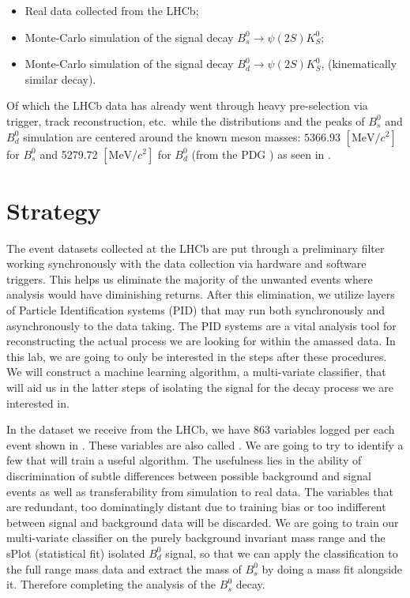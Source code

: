 \begin{itemize}
    \item Real data collected from the LHCb;
    \item Monte-Carlo simulation of the signal decay $B_{s}^{0}\rightarrow \psi(2S)K_{S}^{0}$;
    \item Monte-Carlo simulation of the signal decay $B_{d}^{0}\rightarrow \psi(2S)K_{S}^{0}$, (kinematically similar decay).
\end{itemize}
Of which the LHCb data has already went through heavy pre-selection via trigger, track reconstruction, etc.\ while the distributions and the peaks of $B_{s}^{0}$ and $B_{d}^{0}$ simulation are centered around the known meson masses: $5366.93$ $[\text{MeV}/c^2]$ for $B_s^0$ and 5279.72 $[\text{MeV}/c^2]$ for $B_d^0$ (from the PDG \cite{PDG}) as seen in . 


\section{Strategy}
The event datasets collected at the LHCb are put through a preliminary filter working synchronously with the data collection via hardware and software triggers. This helps us eliminate the majority of the unwanted events where analysis would have diminishing returns. After this elimination, we utilize layers of Particle Identification systems (PID) that may run both synchronously and asynchronously to the data taking. The PID systems are a vital analysis tool for reconstructing the actual process we are looking for within the amassed data. In this lab, we are going to only be interested in the steps after these procedures. We will construct a machine learning algorithm, a multi-variate classifier, that will aid us in the latter steps of isolating the signal for the decay process we are interested in.

In the dataset we receive from the LHCb, we have 863 variables logged per each event shown in . These variables are also called . We are going to try to identify a few that will train a useful algorithm. The usefulness lies in the ability of discrimination of subtle differences between possible background and signal events as well as transferability from simulation to real data. The variables that are redundant, too dominatingly distant due to training bias or too indifferent between signal and background data will be discarded. We are going to train our multi-variate classifier on the purely background invariant mass range and the sPlot (statistical fit) isolated $B_d^0$ signal, so that we can apply the classification to the full range mass data and extract the mass of $B_s^0$ by doing a mass fit alongside it. Therefore completing the analysis of the $B_s^0$ decay.

